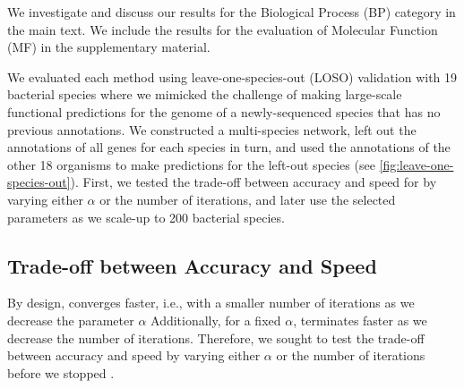 
We investigate and discuss our results for the Biological Process (BP) category in the main text. We include the results for the evaluation of Molecular Function (MF) in the supplementary material. 

We evaluated each method using leave-one-species-out (LOSO) validation with 19 bacterial species where we mimicked the challenge of making large-scale functional predictions for the genome of a newly-sequenced species %
that has no previous annotations.
We constructed a multi-species network, left out the annotations of all genes for each species in turn, and used the annotations of the other 18 organisms to make predictions for the left-out species (see \cref{fig:leave-one-species-out}). 
First, we tested the trade-off between accuracy and speed for \sinksource by varying either $\alpha$ or the number of iterations, 
and later use the selected parameters as we scale-up to 200 bacterial species.


\subsection{Trade-off between Accuracy and Speed}
\label{sec:tradeoff-accuracy-speed}

By design, \sinksource converges faster, i.e., with a smaller number of iterations as we decrease the parameter $\alpha$   Additionally, for a fixed $\alpha$, \sinksource terminates faster as we decrease the number of iterations. Therefore, we sought to test the trade-off between accuracy and speed by varying either $\alpha$ or the number of iterations before we stopped \sinksource. 


